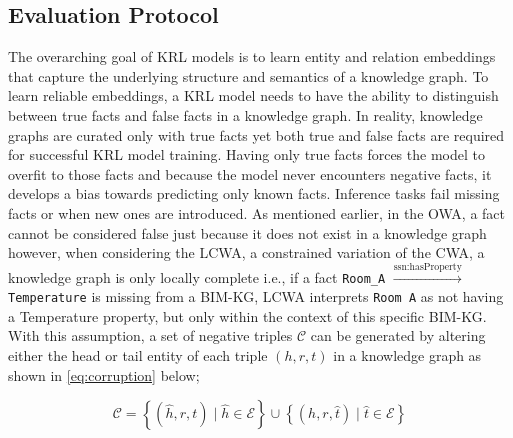 \subsection{Evaluation Protocol}

The overarching goal of \ac{KRL} models is to learn entity and relation embeddings that capture the underlying structure and semantics of a knowledge graph. To learn reliable embeddings, a \ac{KRL} model needs to have the ability to distinguish between true facts and false facts in a knowledge graph. In reality, knowledge graphs are curated only with true facts yet both true and false facts are required for successful \ac{KRL} model training. Having only true facts forces the model to overfit to those facts and because the model never encounters negative facts, it develops a bias towards predicting only known facts. Inference tasks fail missing facts or when new ones are introduced.  As mentioned earlier, in the \ac{OWA}, a fact cannot be considered false just because it does not exist in a knowledge graph however, when considering the \ac{LCWA}, a constrained variation of the \ac{CWA}, a knowledge graph is only locally complete i.e., if a fact \texttt{Room\_A} $\xrightarrow{\text{ssn:hasProperty}}$ \texttt{Temperature} is missing from a \ac{BIM-KG}, \ac{LCWA} interprets \texttt{Room A} as not having a Temperature property, but only within the context of this specific \ac{BIM-KG}. With this assumption, a set of negative triples $\mathcal{C}$ can be generated by altering either the head or tail entity of each triple \( (h, r, t) \) in a knowledge graph as shown in \autoref{eq:corruption} below;

\begin{equation}
\label{eq:corruption}
\mathcal{C} = \left\{(\hat{h}, r, t) \mid \hat{h} \in \mathcal{E}\right\} 
\cup \left\{(h, r, \hat{t}) \mid \hat{t} \in \mathcal{E}\right\}
\end{equation}

